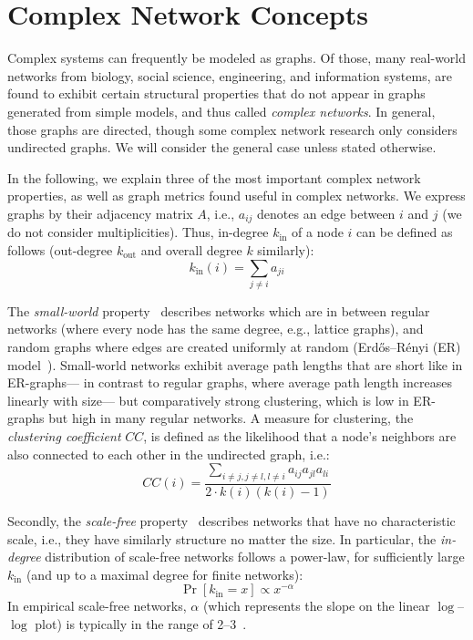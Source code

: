 \section{Complex Network Concepts}\label{sec:background}
Complex systems can frequently be modeled as graphs.
Of those, many real-world networks from biology, social science, engineering, and information systems,
are found to exhibit certain structural properties that do not appear in graphs generated from simple models,
and thus called \emph{complex networks}.
In general, those graphs are directed,
though some complex network research only considers undirected graphs.
We will consider the general case unless stated otherwise.

In the following, we explain three of the most important complex network properties,
as well as graph metrics found useful in complex networks.
We express graphs by their adjacency matrix $A$, i.e., $a_{ij}$ denotes an edge between $i$ and $j$ (we do not consider multiplicities).
Thus, in-degree $k_\text{in}$ of a node $i$ can be defined as follows
(out-degree $k_\text{out}$ and overall degree $k$ similarly):
\begin{equation}
    k_\text{in}(i) = \sum_{j\neq i}{a_{ji}}
\end{equation}

The \emph{small-world} property~\cite{SmallWorld1998Watts} describes networks which are in between regular networks
(where every node has the same degree, e.g., lattice graphs),
and random graphs where edges are created uniformly at random (Erd\H{o}s--R\'enyi (ER) model~\cite{RandomGraph1959Erdos}).
Small-world networks exhibit average path lengths
that are short like in ER-graphs---%
in contrast to regular graphs, where average path length increases linearly with size---%
but comparatively strong clustering, which is low in ER-graphs but high in many regular networks.
A measure for clustering, the \emph{clustering coefficient} $CC$,
is defined as the likelihood that a node's neighbors are also connected to each other in the undirected graph,
i.e.:
\begin{equation}
    CC(i) = \frac{\sum_{i\neq j,j\neq l,l\neq i}{a_{ij}a_{jl}a_{li}}}{2\cdot k(i)(k(i) - 1)}
\end{equation}

Secondly, the \emph{scale-free} property~\cite{ScaleFree1999Albert} describes networks that have no characteristic scale,
i.e., they have similarly structure no matter the size.
In particular,
the \emph{in-degree} distribution of scale-free networks follows a power-law,
for sufficiently large $k_\text{in}$ (and up to a maximal degree for finite networks):
\begin{equation}
    \Pr[k_\text{in}=x] \propto x^{-\alpha}
\end{equation}
In empirical scale-free networks, $\alpha$ (which represents the slope on the linear $\log$--$\log$ plot) is typically in the range of \numrange{2}{3}~\cite{PowlawEmpiric2009Clauset}.

